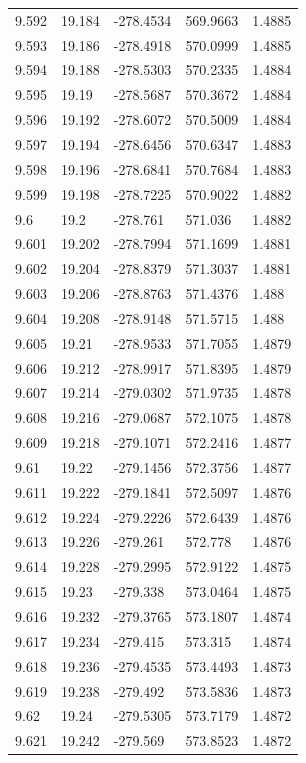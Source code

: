 \begin{tabular}{lllll}
9.592 & 19.184 & -278.4534 & 569.9663 & 1.4885 \\
9.593 & 19.186 & -278.4918 & 570.0999 & 1.4885 \\
9.594 & 19.188 & -278.5303 & 570.2335 & 1.4884 \\
9.595 & 19.19 & -278.5687 & 570.3672 & 1.4884 \\
9.596 & 19.192 & -278.6072 & 570.5009 & 1.4884 \\
9.597 & 19.194 & -278.6456 & 570.6347 & 1.4883 \\
9.598 & 19.196 & -278.6841 & 570.7684 & 1.4883 \\
9.599 & 19.198 & -278.7225 & 570.9022 & 1.4882 \\
9.6 & 19.2 & -278.761 & 571.036 & 1.4882 \\
9.601 & 19.202 & -278.7994 & 571.1699 & 1.4881 \\
9.602 & 19.204 & -278.8379 & 571.3037 & 1.4881 \\
9.603 & 19.206 & -278.8763 & 571.4376 & 1.488 \\
9.604 & 19.208 & -278.9148 & 571.5715 & 1.488 \\
9.605 & 19.21 & -278.9533 & 571.7055 & 1.4879 \\
9.606 & 19.212 & -278.9917 & 571.8395 & 1.4879 \\
9.607 & 19.214 & -279.0302 & 571.9735 & 1.4878 \\
9.608 & 19.216 & -279.0687 & 572.1075 & 1.4878 \\
9.609 & 19.218 & -279.1071 & 572.2416 & 1.4877 \\
9.61 & 19.22 & -279.1456 & 572.3756 & 1.4877 \\
9.611 & 19.222 & -279.1841 & 572.5097 & 1.4876 \\
9.612 & 19.224 & -279.2226 & 572.6439 & 1.4876 \\
9.613 & 19.226 & -279.261 & 572.778 & 1.4876 \\
9.614 & 19.228 & -279.2995 & 572.9122 & 1.4875 \\
9.615 & 19.23 & -279.338 & 573.0464 & 1.4875 \\
9.616 & 19.232 & -279.3765 & 573.1807 & 1.4874 \\
9.617 & 19.234 & -279.415 & 573.315 & 1.4874 \\
9.618 & 19.236 & -279.4535 & 573.4493 & 1.4873 \\
9.619 & 19.238 & -279.492 & 573.5836 & 1.4873 \\
9.62 & 19.24 & -279.5305 & 573.7179 & 1.4872 \\
9.621 & 19.242 & -279.569 & 573.8523 & 1.4872 \\

\end{tabular}
